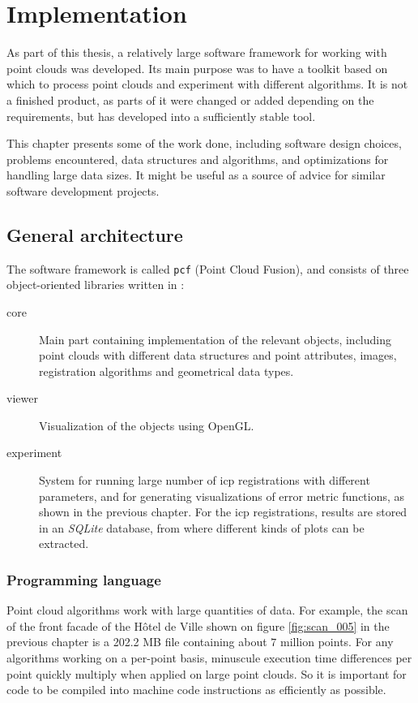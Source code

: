 \chapter{Implementation} \label{ch:implementation}
As part of this thesis, a relatively large software framework for working with point clouds was developed. Its main purpose was to have a toolkit based on which to process point clouds and experiment with different algorithms. It is not a finished product, as parts of it were changed or added depending on the requirements, but has developed into a sufficiently stable tool.

This chapter presents some of the work done, including software design choices, problems encountered, data structures and algorithms, and optimizations for handling large data sizes. It might be useful as a source of advice for similar software development projects.

\section{General architecture}
The software framework is called \texttt{pcf} (Point Cloud Fusion), and consists of three object-oriented libraries written in \cpp{}:
\begin{description}
\item[core] Main part containing implementation of the relevant objects, including point clouds with different data structures and point attributes, images, registration algorithms and geometrical data types.
\item[viewer] Visualization of the objects using OpenGL.
\item[experiment] System for running large number of \gls{icp} registrations with different parameters, and for generating visualizations of error metric functions, as shown in the previous chapter. For the \gls{icp} registrations, results are stored in an \emph{SQLite} database, from where different kinds of plots can be extracted.
\end{description}

\subsection{Programming language}
Point cloud algorithms work with large quantities of data. For example, the scan of the front facade of the Hôtel de Ville shown on figure \ref{fig:scan_005} in the previous chapter is a 202.2 MB file containing about $7$ million points. For any algorithms working on a per-point basis, minuscule execution time differences per point quickly multiply when applied on large point clouds. So it is important for code to be compiled into machine code instructions as efficiently as possible.

